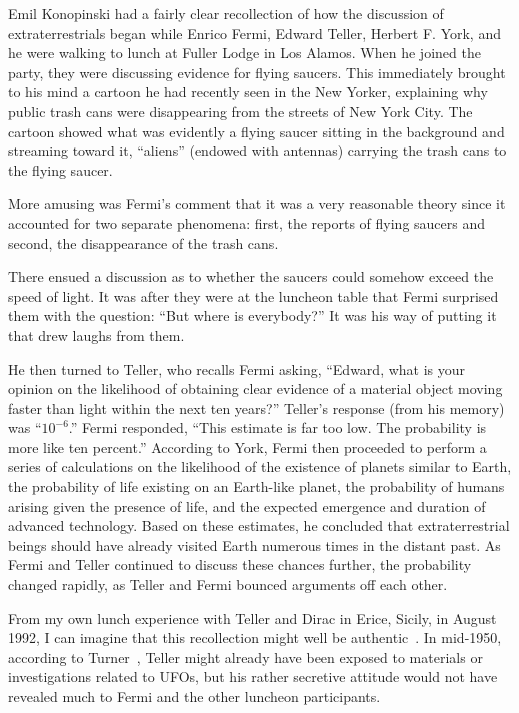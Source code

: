 Emil Konopinski had a fairly clear recollection of how the discussion of extraterrestrials began while Enrico Fermi, Edward Teller, Herbert F. York, and he were walking to lunch at Fuller Lodge in Los Alamos. When he joined the party, they were discussing evidence for flying saucers. This immediately brought to his mind a cartoon he had recently seen in the New Yorker, explaining why public trash cans were disappearing from the streets of New York City. The cartoon showed what was evidently a flying saucer sitting in the background and streaming toward it, ``aliens'' (endowed with antennas) carrying the trash cans to the flying saucer.

More amusing was Fermi's comment that it was a very reasonable theory since it accounted for two separate phenomena: first, the reports of flying saucers and second, the disappearance of the trash cans.

There ensued a discussion as to whether the saucers could somehow exceed the speed of light. It was after they were at the luncheon table that Fermi surprised them with the question: ``But where is everybody?'' It was his way of putting it that drew laughs from them.

He then turned to Teller, who recalls Fermi asking, ``Edward, what is your opinion on the likelihood of obtaining clear evidence of a material object moving faster than light within the next ten years?'' Teller's response (from his memory) was ``$10^{-6}$.'' Fermi responded, ``This estimate is far too low. The probability is more like ten percent.'' According to York, Fermi then proceeded to perform a series of calculations on the likelihood of the existence of planets similar to Earth, the probability of life existing on an Earth-like planet, the probability of humans arising given the presence of life, and the expected emergence and duration of advanced technology. Based on these estimates, he concluded that extraterrestrial beings should have already visited Earth numerous times in the distant past. As Fermi and Teller continued to discuss these chances further, the probability changed rapidly, as Teller and Fermi bounced arguments off each other.

From my own lunch experience with Teller and Dirac in Erice, Sicily, in August 1992,
I can imagine that this recollection might well be authentic~\cite{dirac-81}.
In mid-1950, according to Turner~\cite{TurnerAustralia1971}, Teller might already have been
exposed to materials or investigations related to UFOs, but his rather secretive attitude would not have revealed much to Fermi and the other luncheon participants.


